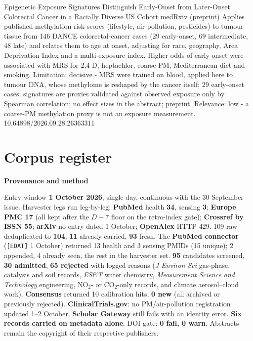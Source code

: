 \documentclass[10pt]{article}
\begin{document}
{Epigenetic Exposure Signatures Distinguish Early-Onset from Later-Onset Colorectal Cancer in a Racially Diverse US Cohort}
{medRxiv (preprint)}
{Applies published methylation risk scores (lifestyle, air pollution, pesticides) to tumour tissue from 146 DANCE colorectal-cancer cases (29 early-onset, 69 intermediate, 48 late) and relates them to age at onset, adjusting for race, geography, Area Deprivation Index and a multi-exposure index. Higher odds of early onset were associated with MRS for 2,4-D, heptachlor, coarse PM, Mediterranean diet and smoking. Limitation: decisive - MRS were trained on blood, applied here to tumour DNA, whose methylome is reshaped by the cancer itself; 29 early-onset cases; signatures are proxies validated against observed exposure only by Spearman correlation; no effect sizes in the abstract; preprint. Relevance: low - a coarse-PM methylation proxy is not an exposure measurement.}
{10.64898/2026.09.28.26363311}

\clearpage
\section*{\sffamily\bfseries\color{Deep}Corpus register}
\vspace{-1.5mm}{\color{Amber}\rule{\linewidth}{1.1pt}}\vspace{2.5mm}



\vspace{2mm}

\begin{keybox}
{\sffamily\bfseries\footnotesize\color{Deep}Provenance and method}\\[1.2mm]
{\fontsize{7.2}{8.8}\selectfont
Entry window \textbf{1 October 2026}, single day, continuous with the 30 September issue.
Harvester legs run leg-by-leg: \textbf{PubMed} health \textbf{34}, sensing \textbf{3}; \textbf{Europe PMC}
\textbf{17} (all kept after the $D-7$ floor on the retro-index gate); \textbf{Crossref by ISSN} \textbf{55};
\textbf{arXiv} no entry dated 1 October; \textbf{OpenAlex} HTTP 429. 109 raw deduplicated to \textbf{104},
\textbf{11} already carried, \textbf{93} fresh. The \textbf{PubMed connector} (\texttt{[EDAT]} 1 October)
returned 13 health and 3 sensing PMIDs (15 unique); 2 appended, 4 already seen, the rest in the
harvester set. \textbf{95} candidates screened, \textbf{30 admitted}, \textbf{65 rejected} with logged
reasons (\textit{J Environ Sci} gas-phase, catalysis and soil records, \textit{ES\&T} water chemistry,
\textit{Measurement Science and Technology} engineering, NO$_2$- or CO$_2$-only records, and climate
aerosol--cloud work). \textbf{Consensus} returned 10 calibration hits, \textbf{0 new} (all archived or
previously rejected). \textbf{ClinicalTrials.gov}: no PM/air-pollution registration updated 1--2 October.
\textbf{Scholar Gateway} still fails with an identity error. \textbf{Six records carried on metadata
alone}. DOI gate: \textbf{0 fail, 0 warn}. Abstracts remain the copyright of their respective
publishers.\par}
\end{keybox}
\end{document}
